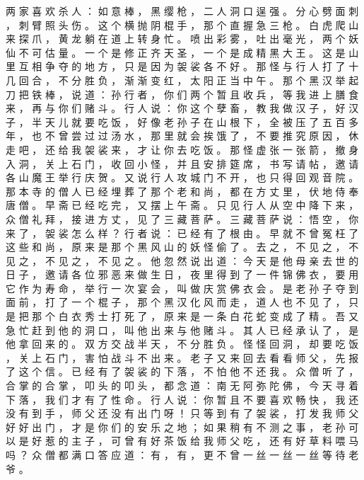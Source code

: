 {两 家 喜 欢 杀 人 ： 如 意 棒 ， 黑 缨 枪 ， 二 人 洞 口 逞 强 。
分 心 劈 面 刺 ， 刺 臂 照 头 伤 。
这 个 横 抛 阴 棍 手 ， 那 个 直 握 急 三 枪 。
白 虎 爬 山 来 探 爪 ， 黄 龙 躺 在 道 上 转 身 忙 。
喷 出 彩 雾 ， 吐 出 毫 光 ， 两 个 妖 仙 不 可 估 量 。
一 个 是 修 正 齐 天 圣 ， 一 个 是 成 精 黑 大 王 。
这 是 山 里 互 相 争 夺 的 地 方 ， 只 是 因 为 袈 裟 各 不 好 。
那 怪 与 行 人 打 了 十 几 回 合 ， 不 分 胜 负 ， 渐 渐 变 红 ， 太 阳 正 当 中 午 。
那 个 黑 汉 举 起 刀 把 铁 棒 ， 说 道 ： 孙 行 者 ， 你 们 两 个 暂 且 收 兵 ， 等 我 进 上 膳 食 来 ， 再 与 你 们 赌 斗 。
行 人 说 ： 你 这 个 孽 畜 ， 教 我 做 汉 子 ， 好 汉 子 ， 半 天 儿 就 要 吃 饭 ， 好 像 老 孙 子 在 山 根 下 ， 全 被 压 了 五 百 多 年 ， 也 不 曾 尝 过 过 汤 水 ， 那 里 就 会 挨 饿 了 ， 不 要 推 究 原 因 ， 休 走 吧 ， 还 给 我 袈 裟 来 ， 才 让 你 去 吃 饭 。
那 怪 虚 张 一 张 箭 ， 撤 身 入 洞 ， 关 上 石 门 ， 收 回 小 怪 ， 并 且 安 排 筵 席 ， 书 写 请 帖 ， 邀 请 各 山 魔 王 举 行 庆 贺 。
又 说 行 人 攻 城 门 不 开 ， 也 只 得 回 观 音 院 。
那 本 寺 的 僧 人 已 经 埋 葬 了 那 个 老 和 尚 ， 都 在 方 丈 里 ， 伏 地 侍 奉 唐 僧 。
早 斋 已 经 吃 完 ， 又 摆 上 午 斋 。
只 见 行 人 从 空 中 降 下 来 ， 众 僧 礼 拜 ， 接 进 方 丈 ， 见 了 三 藏 菩 萨 。
三 藏 菩 萨 说 ： 悟 空 ， 你 来 了 ， 袈 裟 怎 么 样 ？ 行 者 说 ： 已 经 有 了 根 由 。
早 就 不 曾 冤 枉 了 这 些 和 尚 ， 原 来 是 那 个 黑 风 山 的 妖 怪 偷 了 。
去 之 ， 不 见 之 ， 不 见 之 ， 不 见 之 ， 不 见 之 。
他 忽 然 说 出 道 ： 今 天 是 他 母 亲 去 世 的 日 子 ， 邀 请 各 位 邪 恶 来 做 生 日 ， 夜 里 得 到 了 一 件 锦 佛 衣 ， 要 用 它 作 为 寿 命 ， 举 行 一 次 宴 会 ， 叫 做 庆 赏 佛 衣 会 。
是 老 孙 子 夺 到 面 前 ， 打 了 一 个 棍 子 ， 那 个 黑 汉 化 风 而 走 ， 道 人 也 不 见 了 ， 只 是 把 那 个 白 衣 秀 士 打 死 了 ， 原 来 是 一 条 白 花 蛇 变 成 了 精 。
吾 又 急 忙 赶 到 他 的 洞 口 ， 叫 他 出 来 与 他 赌 斗 。
其 人 已 经 承 认 了 ， 是 他 拿 回 来 的 。
双 方 交 战 半 天 ， 不 分 胜 负 。
怪 怪 回 洞 ， 却 要 吃 饭 ， 关 上 石 门 ， 害 怕 战 斗 不 出 来 。
老 子 又 来 回 去 看 看 师 父 ， 先 报 了 这 个 信 。
已 经 有 了 袈 裟 的 下 落 ， 不 怕 他 不 还 我 。
众 僧 听 了 ， 合 掌 的 合 掌 ， 叩 头 的 叩 头 ， 都 念 道 ： 南 无 阿 弥 陀 佛 ， 今 天 寻 着 下 落 ， 我 们 才 有 了 性 命 。
行 人 说 ： 你 暂 且 不 要 喜 欢 畅 快 ， 我 还 没 有 到 手 ， 师 父 还 没 有 出 门 呀 ！
只 等 到 有 了 袈 裟 ， 打 发 我 师 父 好 好 出 门 ， 才 是 你 们 的 安 乐 之 地 ； 如 果 稍 有 不 测 之 事 ， 老 孙 可 以 是 好 惹 的 主 子 ， 可 曾 有 好 茶 饭 给 我 师 父 吃 ， 还 有 好 草 料 喂 马 吗 ？ 众 僧 都 满 口 答 应 道 ： 有 ， 有 ， 更 不 曾 一 丝 一 丝 一 丝 等 待 老 爷 。
}

